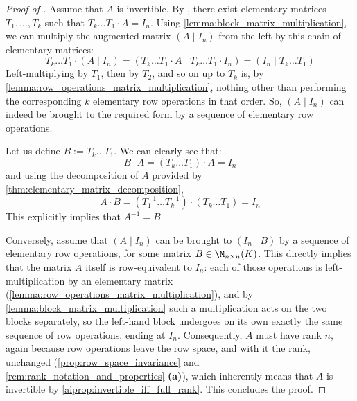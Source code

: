 \begin{proof}[Proof of ]
Assume that $A$ is invertible. By , there exist elementary matrices $T_1, \dots, T_k$ such that $T_k \dots T_1 \cdot A = I_n$. Using \cref{lemma:block_matrix_multiplication}, we can multiply the augmented matrix $(A \mid I_n)$ from the left by this chain of elementary matrices:
\begin{equation*}
    T_k \dots T_1 \cdot \left(A \mid I_n\right) = \left(T_k \dots T_1 \cdot A \mid T_k \dots T_1 \cdot I_n\right) = \left(I_n \mid T_k \dots T_1\right)
\end{equation*}
Left-multiplying by $T_1$, then by $T_2$, and so on up to $T_k$ is, by \cref{lemma:row_operations_matrix_multiplication}, nothing other than performing the corresponding $k$ elementary row operations in that order. So, $(A \mid I_n)$ can indeed be brought to the required form by a sequence of elementary row operations.

Let us define $B := T_k \dots T_1$. We can clearly see that:
\begin{equation*}
    B \cdot A = (T_k \dots T_1) \cdot A = I_n
\end{equation*}
and using the decomposition of $A$ provided by \cref{thm:elementary_matrix_decomposition},
\begin{equation*}
    A \cdot B = (T_1^{-1} \dots T_k^{-1}) \cdot (T_k \dots T_1) = I_n
\end{equation*}
This explicitly implies that $A^{-1} = B$.

Conversely, assume that $(A \mid I_n)$ can be brought to $(I_n \mid B)$ by a sequence of elementary row operations, for some matrix $B \in \M_{n \times n}(K)$. This directly implies that the matrix $A$ itself is row-equivalent to $I_n$: each of those operations is left-multiplication by an elementary matrix (\cref{lemma:row_operations_matrix_multiplication}), and by \cref{lemma:block_matrix_multiplication} such a multiplication acts on the two blocks separately, so the left-hand block undergoes on its own exactly the same sequence of row operations, ending at $I_n$. Consequently, $A$ must have rank $n$, again because row operations leave the row space, and with it the rank, unchanged (\cref{prop:row_space_invariance} and \cref{rem:rank_notation_and_properties} \textbf{(a)}), which inherently means that $A$ is invertible by \cref{aiprop:invertible_iff_full_rank}. This concludes the proof.
\end{proof}


